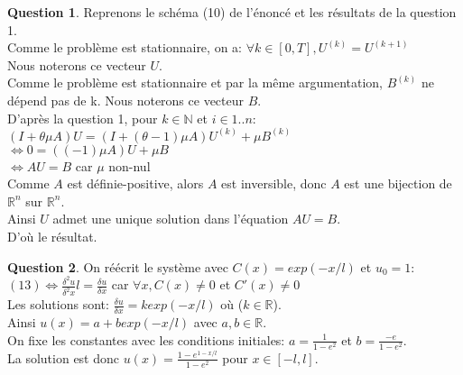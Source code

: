 \documentclass[a4paper]{article}
\theoremstyle{definition}
\newtheorem{que}{Question}
\begin{document}
	\setcounter{que}{5}
	\begin{que}
		Reprenons le schéma (10) de l'énoncé et les résultats de la question 1. \\

		Comme le problème est stationnaire, on a: $\forall k \in [0, T],  U^{(k)}=U^{(k+1)}$ \\
		Nous noterons ce vecteur $U$. \\

		Comme le problème est stationnaire et par la même argumentation, $B^{(k)}$ ne dépend pas de k. Nous noterons ce vecteur $B$. \\

		D'après la question 1, pour $k \in \mathbb{N}$ et $i \in 1..n$: \\
		$(I + \theta \mu A)U = (I + (\theta - 1) \mu A)U^{(k)} + \mu B^{(k)}$ \\
		$\Leftrightarrow 0 = (( - 1) \mu A)U + \mu B$ \\
		$\Leftrightarrow AU = B$ car $\mu$ non-nul \\
		Comme $A$ est définie-positive, alors $A$ est inversible, donc $A$ est une bijection de $\mathbb{R}^n$ sur $\mathbb{R}^n$. \\
		Ainsi $U$ admet une unique solution dans l'équation $AU=B$.\\
		D'où le résultat. \\
	\end{que}
	\begin{que}
		On réécrit le système avec $C(x)=exp(-x/l)$ et $u_0 = 1$: \\
		$(13) \Leftrightarrow \frac{\delta^2 u}{\delta^2 x} l = \frac{\delta u }{\delta x}$ car $\forall x, C(x) \ne 0$ et $C'(x) \ne 0$\\
		Les solutions sont: $ \frac{\delta u }{\delta x} = k exp(-x/l)$ où ($k \in \mathbb{R}$). \\
		Ainsi $u(x) = a + b exp(-x/l)$ avec $a, b \in \mathbb{R}$. \\
		On fixe les constantes avec les conditions initiales: $a=\frac{1}{1-e^2}$ et $b=\frac{-e}{1-e^2}$. \\
		La solution est donc $u(x)=\frac{1 - e^{1-x/l}}{1-e^2}$ pour $x \in [-l, l]$.\\
	\end{que}
\end{document}
